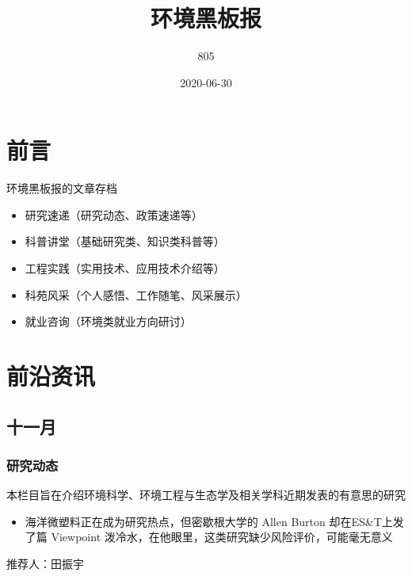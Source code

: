 \documentclass[
]{book}
\title{环境黑板报}
\author{805}
\date{2020-06-30}
\providecommand{\tightlist}{%
  \setlength{\itemsep}{0pt}\setlength{\parskip}{0pt}}
\begin{document}
\maketitle

{
\setcounter{tocdepth}{1}
\tableofcontents
}
\hypertarget{ux524dux8a00}{%
\chapter{前言}\label{ux524dux8a00}}

环境黑板报的文章存档

\begin{itemize}
\item
  研究速递（研究动态、政策速递等）
\item
  科普讲堂（基础研究类、知识类科普等）
\item
  工程实践（实用技术、应用技术介绍等）
\item
  科苑风采（个人感悟、工作随笔、风采展示）
\item
  就业咨询（环境类就业方向研讨）
\end{itemize}

\hypertarget{ux524dux6cbfux8d44ux8baf}{%
\chapter{前沿资讯}\label{ux524dux6cbfux8d44ux8baf}}

\hypertarget{ux5341ux4e00ux6708}{%
\section*{十一月}\label{ux5341ux4e00ux6708}}

\hypertarget{ux7814ux7a76ux52a8ux6001}{%
\subsection*{研究动态}\label{ux7814ux7a76ux52a8ux6001}}

本栏目旨在介绍环境科学、环境工程与生态学及相关学科近期发表的有意思的研究

\begin{itemize}
\tightlist
\item
  海洋微塑料正在成为研究热点，但密歇根大学的 Allen Burton 却在ES\&T上发了篇 Viewpoint 泼冷水，在他眼里，这类研究缺少风险评价，可能毫无意义
\end{itemize}

推荐人：田振宇
\end{document}
